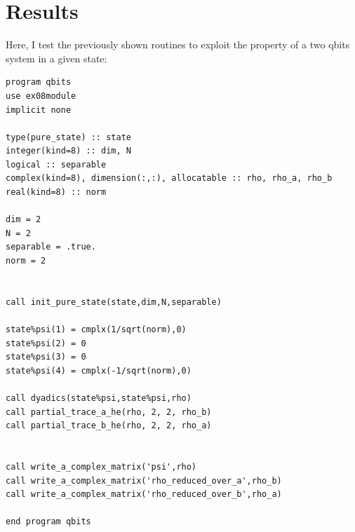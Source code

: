 \documentclass[prb,9pt,notitlepage]{revtex4-1}
\begin{document}
\section{Results}
Here, I test the previously shown routines to exploit the property of a two qbits system in a given state:
\begin{lstlisting}
program qbits
use ex08module
implicit none

type(pure_state) :: state
integer(kind=8) :: dim, N
logical :: separable
complex(kind=8), dimension(:,:), allocatable :: rho, rho_a, rho_b
real(kind=8) :: norm

dim = 2
N = 2
separable = .true.
norm = 2


call init_pure_state(state,dim,N,separable)

state%psi(1) = cmplx(1/sqrt(norm),0)
state%psi(2) = 0
state%psi(3) = 0
state%psi(4) = cmplx(-1/sqrt(norm),0)

call dyadics(state%psi,state%psi,rho)
call partial_trace_a_he(rho, 2, 2, rho_b)
call partial_trace_b_he(rho, 2, 2, rho_a)


call write_a_complex_matrix('psi',rho)
call write_a_complex_matrix('rho_reduced_over_a',rho_b)
call write_a_complex_matrix('rho_reduced_over_b',rho_a)

end program qbits
\end{lstlisting}
\end{document}
